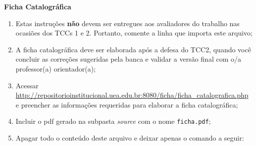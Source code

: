 \begin{center} \LARGE \bf Ficha Catalográfica \end{center}


\begin{enumerate}
    \item Estas instruções \textbf{não} devem ser entregues aos avaliadores do trabalho nas ocasiões dos TCCs 1 e 2. Portanto, comente a linha que importa este arquivo;
    \item A ficha catalográfica deve ser elaborada após a defesa do TCC2, quando você concluir as correções sugeridas pela banca e validar a versão final com o/a professor(a) orientador(a);
    \item Acessar \url{http://repositorioinstitucional.uea.edu.br:8080/ficha/ficha_catalografica.php} e preencher as informações requeridas para elaborar a ficha catalográfica;
    \item Incluir o pdf gerado na subpasta \emph{source} com o nome \texttt{ficha.pdf};
    \item Apagar todo o conteúdo deste arquivo e deixar apenas o comando a seguir:
    \begin{verbatim}
        
    \end{verbatim}
\end{enumerate}

\newpage

